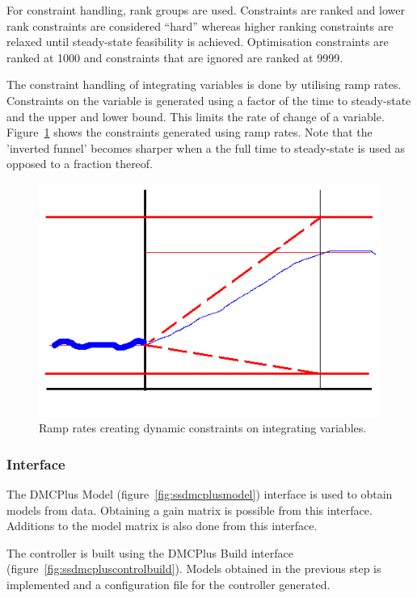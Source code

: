 For constraint handling, rank groups are used.
Constraints are ranked and lower rank constraints are considered ``hard'' whereas higher ranking constraints are relaxed until steady-state feasibility is achieved.
Optimisation constraints are ranked at 1000 and constraints that are ignored are ranked at 9999.

The constraint handling of integrating variables is done by utilising ramp rates.
Constraints on the variable is generated using a factor of the time to steady-state and the upper and lower bound.
This limits the rate of change of a variable.
Figure~\ref{fig:dmcplusramprates} shows the constraints generated using ramp rates.
Note that the 'inverted funnel' becomes sharper when a the full time to steady-state is used as opposed to a fraction thereof.

\begin{figure}[htbp]
  \centering
    \includegraphics[width=\fullwidth]{graph/dmcplusramprate}
  \caption[DMCPlus ramp rate dynamic constraints]{Ramp rates creating dynamic constraints on integrating variables.}
  \label{fig:dmcplusramprates}
\end{figure}

\subsubsection{Interface}
The DMCPlus Model (figure~\ref{fig:ssdmcplusmodel}) interface is used to obtain models from data.
Obtaining a gain matrix is possible from this interface.
Additions to the model matrix is also done from this interface.

The controller is built using the DMCPlus Build interface (figure~\ref{fig:ssdmcpluscontrolbuild}).
Models obtained in the previous step is implemented and a configuration file for the controller generated.

